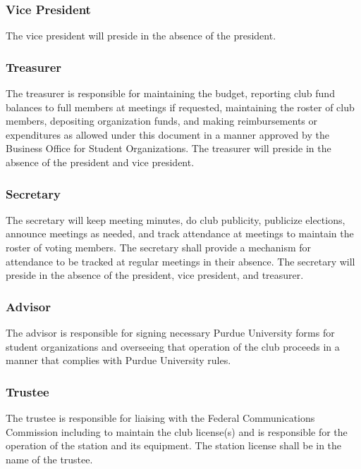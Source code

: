 \documentclass{article}
\begin{document}
\subsubsection{Vice President}

The vice president will preside in the absence of the president.

\subsubsection{Treasurer}

The treasurer is responsible for maintaining the budget, reporting club fund
balances to full members at meetings if requested, maintaining the roster of
club members, depositing organization funds, and making reimbursements or
expenditures as allowed under this document in a manner approved by the Business
Office for Student Organizations. The treasurer will preside in the absence of
the president and vice president.

\subsubsection{Secretary}

The secretary will keep meeting minutes, do club publicity, publicize elections,
announce meetings as needed, and track attendance at meetings to maintain the
roster of voting members. The secretary shall provide a mechanism for attendance
to be tracked at regular meetings in their absence. The secretary will preside
in the absence of the president, vice president, and treasurer.

\subsubsection{Advisor}

The advisor is responsible for signing necessary Purdue University forms for
student organizations and overseeing that operation of the club proceeds in a
manner that complies with Purdue University rules.

\subsubsection{Trustee}

The trustee is responsible for liaising with the Federal Communications
Commission including to maintain the club license(s) and is responsible for the
operation of the station and its equipment. The station license shall be in the
name of the trustee.
\end{document}
